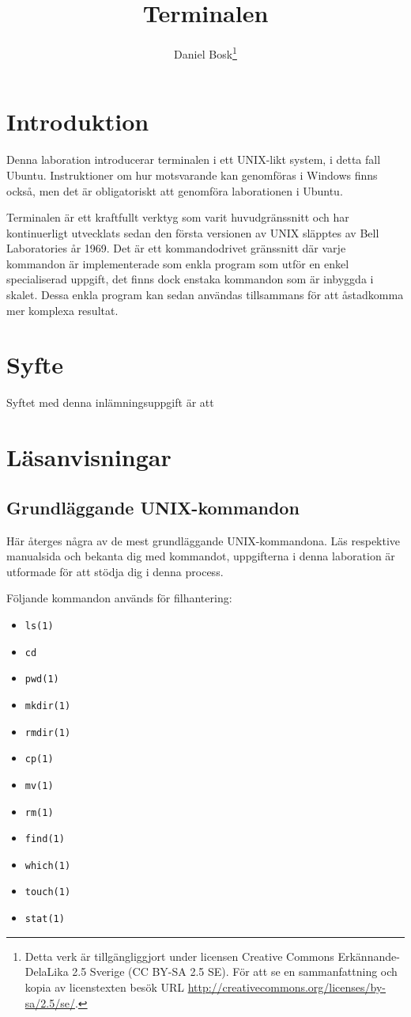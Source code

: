 \documentclass[a4paper]{miunasgn}
\title{Terminalen}
\author{Daniel Bosk\footnote{%
	Detta verk är tillgängliggjort under licensen Creative Commons 
	Erkännande-DelaLika 2.5 Sverige (CC BY-SA 2.5 SE).
	För att se en sammanfattning och kopia av licenstexten besök URL 
	\url{http://creativecommons.org/licenses/by-sa/2.5/se/}.
}}
\date{\svnId}
\begin{document}
\maketitle
\thispagestyle{foot}
\tableofcontents


\section{Introduktion}
\label{sec:Introduktion}
\noindent
Denna laboration introducerar terminalen i ett UNIX-likt system, i detta fall 
Ubuntu.
Instruktioner om hur motsvarande kan genomföras i Windows finns också, men det 
är obligatoriskt att genomföra laborationen i Ubuntu.

Terminalen är ett kraftfullt verktyg som varit huvudgränssnitt och har 
kontinuerligt utvecklats sedan den första versionen av UNIX släpptes av Bell 
Laboratories år 1969.
Det är ett kommandodrivet gränssnitt där varje kommandon är implementerade som 
enkla program som utför en enkel specialiserad uppgift, det finns dock enstaka 
kommandon som är inbyggda i skalet.
Dessa enkla program kan sedan användas tillsammans för att åstadkomma mer 
komplexa resultat.


\section{Syfte}
\label{sec:Syfte}
\noindent
Syftet med denna inlämningsuppgift är att
\begin{itemize}
	
\end{itemize}


\section{Läsanvisningar}
\label{sec:Lasanvisningar}
\noindent


\subsection{Grundläggande UNIX-kommandon}
Här återges några av de mest grundläggande UNIX-kommandona.
Läs respektive manualsida och bekanta dig med kommandot, uppgifterna i denna 
laboration är utformade för att stödja dig i denna process.

Följande kommandon används för filhantering:
\begin{itemize}
  \item \texttt{ls(1)}
  \item \texttt{cd}
  \item \texttt{pwd(1)}
  \item \texttt{mkdir(1)}
  \item \texttt{rmdir(1)}
  \item \texttt{cp(1)}
  \item \texttt{mv(1)}
  \item \texttt{rm(1)}
  \item \texttt{find(1)}
  \item \texttt{which(1)}
  \item \texttt{touch(1)}
  \item \texttt{stat(1)}
\end{itemize}
\end{document}
